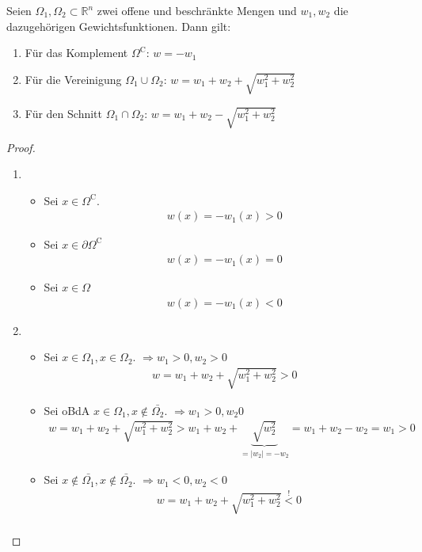 \begin{theorem}
\label{thm:Gewicht}
Seien $\Omega_1, \Omega_2 \subset \mathbb{R}^n$ zwei offene und beschränkte Mengen und $w_{1}, w_{2}$ die dazugehörigen Gewichtsfunktionen. Dann gilt:
\begin{enumerate}
\item Für das Komplement $\Omega^\mathrm{C}$: $w = -w_1$
\item Für die Vereinigung $\Omega_1 \cup \Omega_2$: $w = w_1 + w_2 + \sqrt{w_1^2 + w_2^2}$
\item Für den Schnitt $\Omega_1 \cap \Omega_2$: $w = w_1 + w_2 - \sqrt{w_1^2 + w_2^2}$
\end{enumerate}
\end{theorem}
\begin{proof}
\begin{enumerate}
\item
\begin{itemize}
\item
Sei $x \in \Omega^\mathrm{C}$.
\begin{align*}
w(x) = - w_1(x) > 0
\end{align*}
\item
Sei $x \in \partial \Omega^\mathrm{C}$
\begin{align*}
w(x) = -w_1(x) = 0
\end{align*}
\item
Sei $x \in \Omega$
\begin{align*}
w(x) = -w_1(x) < 0
\end{align*}
\end{itemize}
\item
\begin{itemize}
\item
Sei $x \in \Omega_1, x \in \Omega_2$. $\Rightarrow w_1 >0, w_2>0$
\begin{align*}
w = w_1 + w_2 + \sqrt{w_1^2 + w_2^2} > 0
\end{align*}
\item
Sei \ac{oBdA} $x \in \Omega_1, x \notin \bar{\Omega_2}$. $\Rightarrow w_1 > 0, w_2  0$
\begin{align*}
w =  w_1 + w_2 + \sqrt{w_1^2 + w_2^2} > w_1 + w_2 + \underbrace{\sqrt{w_2^2}}_{=|w_2| = -w_2} = w_1+w_2-w_2 = w_1 > 0
\end{align*}
\item
Sei $x \notin \bar{\Omega_1}, x \notin \bar{\Omega_2}$. $\Rightarrow w_1 < 0, w_2 < 0$
\begin{align*}
&w = w_1 + w_2 + \sqrt{w_1^2 + w_2^2} \overset{!}{<} 0\\

\end{align*}
\end{itemize}
\end{enumerate}
\end{proof}
